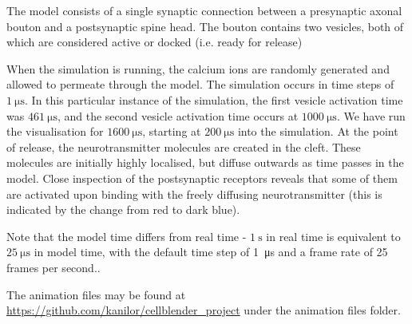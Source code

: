 \documentclass[a4paper]{article}
\begin{document}
The model consists of a single synaptic connection between a presynaptic axonal bouton and a postsynaptic spine head. The bouton contains two vesicles, both of which are considered active or docked (i.e. ready for release)

When the simulation is running, the calcium ions are randomly generated and allowed to permeate through the model. The simulation occurs in time steps of $\SI{1}{\micro\second}$. In this particular instance of the simulation, the first vesicle activation time was $\SI{461}{\micro\second}$, and the second vesicle activation time occurs at $\SI{1000}{\micro\second}$. We have run the visualisation for $\SI{1600}{\micro\second}$, starting at $\SI{200}{\micro\second}$ into the simulation. At the point of release, the neurotransmitter molecules are created in the cleft. These molecules are initially highly localised, but diffuse outwards as time passes in the model. Close inspection of the postsynaptic receptors reveals that some of them are activated upon binding with the freely diffusing neurotransmitter (this is indicated by the change from red to dark blue).

Note that the model time differs from real time - $\SI{1}{\second}$ in real time is equivalent to $\SI{25}{\micro\second}$ in model time, with the default time step of \SI{1}{\micro\second} and a frame rate of 25 frames per second..

The animation files may be found at \url{https://github.com/kanilor/cellblender_project} under the animation files folder.
\end{document}
